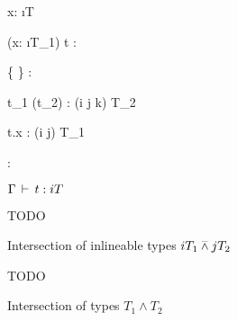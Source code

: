 \begin{figure}[H]
  {\Gamma \ts x: \i{T}}

  {\Gamma \ts (x: \i{T_1}) \ra t : }

  {\Gamma \ts \{  \} : }

  {\Gamma \ts t_1 (t_2) : (i \barwedge j \barwedge k) T_2}

  {\Gamma \ts t.x : (i \barwedge j) T_1}

  {\Gamma \ts {}: }
  
  \caption{$\Gamma \,\vdash\, t: i T$}
\end{figure}

\begin{figure}[H]
  TODO
  \caption{Intersection of inlineable types $i T_1 \barwedge j T_2$}
\end{figure}

\begin{figure}[H]
  TODO
  \caption{Intersection of types ${T_1} \wedge {T_2}$}
\end{figure}
